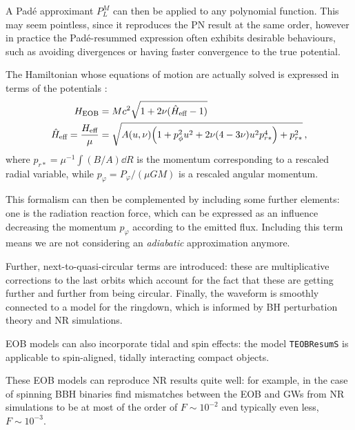 \documentclass[main.tex]{subfiles}
\begin{document}
A Padé approximant \(P_{L}^{M}\) can then be applied to any polynomial function. 
This may seem pointless, since it reproduces the \ac{PN} result at the same order, however in practice the Padé-resummed expression often exhibits desirable behaviours, such as avoiding divergences or having faster convergence to the true potential. 

The Hamiltonian whose equations of motion are actually solved is expressed in terms of the potentials \cite[eq.\ 8.22]{bernuzziNotesGravitationalWaves2021}:  
%
\begin{subequations}
\begin{align}
H _{\text{EOB}} &= Mc^2 \sqrt{1 + 2 \nu (\hat{H} _{\text{eff}} - 1 )}  \\
\hat{H} _{\text{eff}} = \frac{H_{\text{eff}}}{\mu } &= 
\sqrt{ A(u, \nu ) \qty(1 + p^2_{\phi } u^2 + 2 \nu (4-3 \nu ) u^2 p^{4}_{r*}) + p^2_{r*}}
\,,
\end{align}
\end{subequations}
%
where \(p_{r*} = \mu^{-1} \int (B/A) \dd{R} \) is the momentum corresponding to a rescaled radial variable, while \(p_\varphi = P_\varphi / (\mu GM)\) is a rescaled angular momentum. 



This formalism can then be complemented by including some further elements: one is the radiation reaction force, which can be expressed as an influence decreasing the momentum \(p_\varphi \) according to the emitted flux.
Including this term means we are not considering an \emph{adiabatic} approximation anymore. 

Further, next-to-quasi-circular terms are introduced: these are multiplicative corrections to the last orbits which account for the fact that these are getting further and further from being circular. 
Finally, the waveform is smoothly connected to a model for the ringdown, which is informed by \ac{BH} perturbation theory and \ac{NR} simulations. 

\ac{EOB} models can also incorporate tidal and spin effects: the model \texttt{TEOBResumS} \cite{nagarTimedomainEffectiveonebodyGravitational2018} is applicable to spin-aligned, tidally interacting compact objects. 

These \ac{EOB} models can reproduce \ac{NR} results quite well: for example, in the case of spinning \ac{BBH} binaries 
\textcite[fig.\ 2]{nagarAllOneEffective2021} find mismatches between the \ac{EOB} and \acp{GW} from \ac{NR} simulations to be at most of the order of \(F \sim 10^{-2}\) and typically even less, \(F \sim 10^{-3}\).
\end{document}
